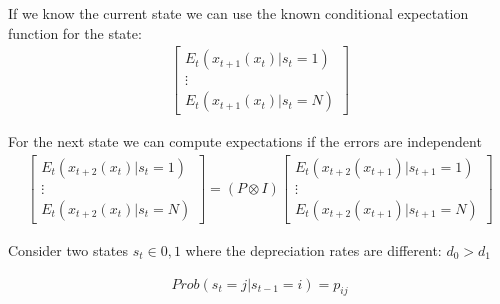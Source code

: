 \documentclass[12pt]{article}
\begin{document}
If we know the current state we can use the known conditional expectation function for the state:
\begin{gather*}
    \begin{bmatrix}
E_t(x_{t+1}(x_{t})|s_{t}=1)  \\    \vdots \\
E_t(x_{t+1}(x_{t})|s_{t}=N)  
  \end{bmatrix}
\end{gather*}

For the next state we can compute expectations if the errors are independent
\begin{gather*}
  \begin{bmatrix}
E_t(x_{t+2}(x_t)|s_{t}=1)  \\    \vdots \\
E_t(x_{t+2}(x_t)|s_{t}=N)  
  \end{bmatrix}=
(P \otimes  I)
  \begin{bmatrix}
E_t(x_{t+2}(x_{t+1})|s_{t+1}=1)  \\    \vdots \\
E_t(x_{t+2}(x_{t+1})|s_{t+1}=N)  
  \end{bmatrix}
\end{gather*}

Consider two states $s_t \in {0,1}$ where the depreciation rates are different:  $d_0>d_1$

\begin{gather}
    Prob(s_t=j|s_{t-1}=i)=p_{ij}
\end{gather}
\end{document}
